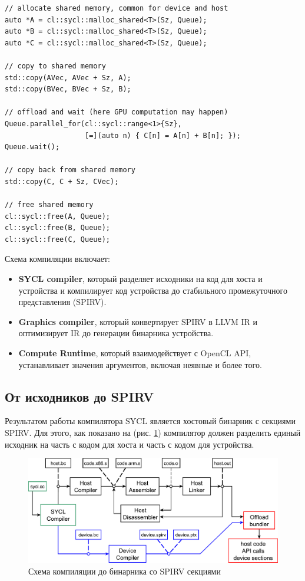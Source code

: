 \documentclass[a4paper,12pt,oneside]{article}
\begin{document}
\begin{lstlisting}[caption={Сложение векторов на SYCL},label={lst:syclvadd}]
// allocate shared memory, common for device and host
auto *A = cl::sycl::malloc_shared<T>(Sz, Queue);
auto *B = cl::sycl::malloc_shared<T>(Sz, Queue);
auto *C = cl::sycl::malloc_shared<T>(Sz, Queue);

// copy to shared memory
std::copy(AVec, AVec + Sz, A);
std::copy(BVec, BVec + Sz, B);

// offload and wait (here GPU computation may happen)
Queue.parallel_for(cl::sycl::range<1>{Sz},
                   [=](auto n) { C[n] = A[n] + B[n]; });
Queue.wait();

// copy back from shared memory
std::copy(C, C + Sz, CVec);

// free shared memory 
cl::sycl::free(A, Queue);
cl::sycl::free(B, Queue);
cl::sycl::free(C, Queue);
\end{lstlisting}

Схема компиляции включает:

\begin{itemize}
\item \textbf{SYCL compiler}, который разделяет исходники на код для хоста и устройства и компилирует код устройства до стабильного промежуточного представления (SPIRV).
\item \textbf{Graphics compiler}, который конвертирует SPIRV в LLVM IR и оптимизирует IR до генерации бинарника устройства. 
\item \textbf{Compute Runtime}, который взаимодействует с OpenCL API, устанавливает значения аргументов, включая неявные и более того.
\end{itemize}

\subsection{От исходников до SPIRV}\label{subsec:syclcompiler}

Результатом работы компилятора SYCL является хостовый бинарник с секциями SPIRV. Для этого, как показано на (рис. \ref{fig:syclscheme}) компилятор должен разделить единый исходник на часть с кодом для хоста и часть с кодом для устройства.

\begin{figure}
\centering
\includegraphics[width=1.0\textwidth]{pictures/sycl-scheme.pdf}
\caption{Схема компиляции до бинарника со SPIRV секциями}
\label{fig:syclscheme}
\end{figure}
\end{document}
